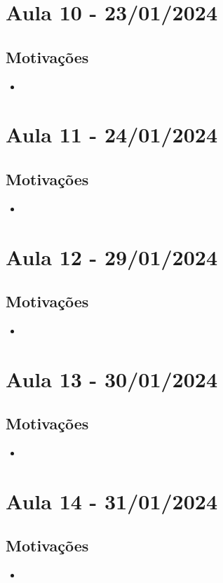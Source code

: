 \documentclass{article}
\begin{document}
\section{Aula 10 - 23/01/2024}
\subsection{Motivações}
\begin{itemize}
	\item
\end{itemize}
\newpage
\section{Aula 11 - 24/01/2024}
\subsection{Motivações}
\begin{itemize}
	\item
\end{itemize}
\newpage
\section{Aula 12 - 29/01/2024}
\subsection{Motivações}
\begin{itemize}
	\item
\end{itemize}
\newpage
\section{Aula 13 - 30/01/2024}
\subsection{Motivações}
\begin{itemize}
	\item
\end{itemize}
\newpage
\section{Aula 14 - 31/01/2024}
\subsection{Motivações}
\begin{itemize}
	\item
\end{itemize}
\newpage
\end{document}
